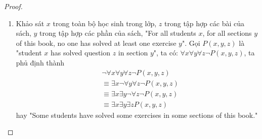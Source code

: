 \begin{proof}
\begin{enumerate}[label=\alph*)]
        \item Khảo sát $x$ trong toàn bộ học sinh trong lớp, $z$ trong tập hợp các bài của sách, $y$ trong tập hợp các phần của sách, "For all students $x$, for all sections $y$ of this book, no one has solved at least one exercise $y$". Gọi $P(x,y,z)$ là "student $x$ has solved question $z$ in section $y$", ta có: $\forall x\forall y\forall z \neg P(x,y,z)$, ta phủ định thành
        \begin{align*}
            &\neg\forall x\forall y\forall z\neg P(x,y,z)\\
            &\equiv \exists x\neg \forall y\forall z\neg P(x,y,z)\\
            &\equiv \exists x\exists y\neg\forall z\neg P(x,y,z)\\
            &\equiv \exists x\exists y\exists zP(x,y,z)
        \end{align*}hay "Some students have solved some exercises in some sections of this book."
    \end{enumerate}
\end{proof}
